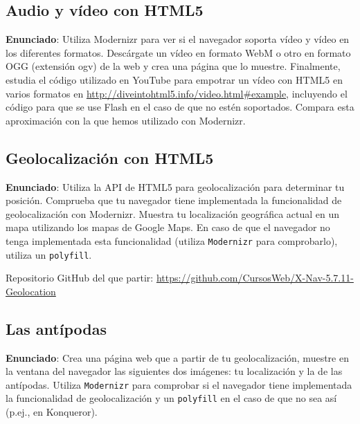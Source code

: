 \subsection{Audio y vídeo con HTML5}
\label{subsec:audio-video}

\textbf{Enunciado}: Utiliza Modernizr para ver si el navegador soporta vídeo y vídeo en los diferentes formatos. Descárgate un vídeo en formato WebM o otro en formato OGG (extensión ogv) de la web y crea una página que lo muestre. Finalmente, estudia el código utilizado en YouTube para empotrar un vídeo con HTML5 en varios formatos en \url{http://diveintohtml5.info/video.html#example}, incluyendo el código para que se use Flash en el caso de que no estén soportados. Compara esta aproximación con la que hemos utilizado con Modernizr.

\subsection{Geolocalización con HTML5}
\label{subsec:geolocalizacion}

\textbf{Enunciado}: Utiliza la API de HTML5 para geolocalización para determinar tu posición. Comprueba que tu navegador tiene implementada la funcionalidad de geolocalización con Modernizr. Muestra tu localización geográfica actual en un mapa utilizando los mapas de Google Maps. En caso de que el navegador no tenga implementada esta funcionalidad (utiliza \texttt{Modernizr} para comprobarlo), utiliza un \texttt{polyfill}.

Repositorio GitHub del que partir: \url{https://github.com/CursosWeb/X-Nav-5.7.11-Geolocation}

\subsection{Las antípodas}
\label{subsec:antipodas}

\textbf{Enunciado}: Crea una página web que a partir de tu geolocalización, muestre en la ventana del navegador las siguientes dos imágenes: tu localización y la de las antípodas. Utiliza \texttt{Modernizr} para comprobar si el navegador tiene implementada la funcionalidad de geolocalización y un \texttt{polyfill} en el caso de que no sea así (p.ej., en Konqueror).


